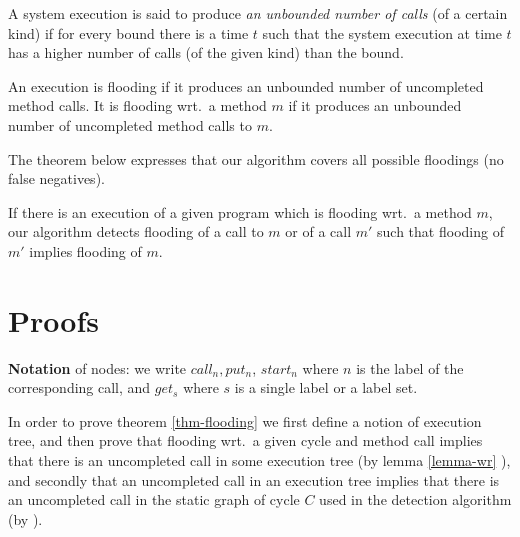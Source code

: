 \begin{definition}\label{def-unbounded}
  A system execution is said to produce \emph{an unbounded number of
    calls} (of a certain kind) if for every bound there is a time $t$
  such that the system execution at time $t$ has a higher number of
  calls (of the given kind) than the bound.
\end{definition}

\begin{definition}[Flooding]\label{def-flooding-ex}
  An execution is flooding if it produces an unbounded number of
  uncompleted method calls.  It is flooding wrt.\ a method $m$ if it
  produces an unbounded number of uncompleted method calls to $m$.
\end{definition}


The theorem below expresses that our algorithm covers all possible floodings
(no false negatives).

\begin{theorem}
\label{theorem-main}
If there is an execution of a given program which is flooding wrt.\ a
method $m$, our algorithm detects flooding of a call to $m$ or of a
call $m'$ such that flooding of $m'$ implies flooding of $m$.
\end{theorem}
\section{Proofs}

\textbf{Notation} of nodes: we write $call_n, put_n$, $start_n$
   where $n$ is the label of the corresponding call, and
   $get_s$  where  $s$ is a single label or a label set.


In order to prove  theorem \ref{thm-flooding}
we first define a notion of execution tree, and then prove that flooding
wrt.\ a given cycle and method call 
implies that there is an uncompleted call in some execution tree (by
lemma \ref{lemma-wr}%
), and secondly that an uncompleted call
in an execution tree implies that there is an uncompleted call in the
static graph of cycle $C$ used in the detection algorithm (by
).

